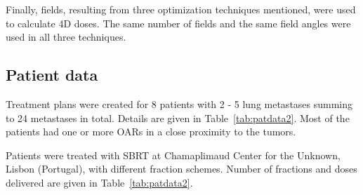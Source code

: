 \documentclass[type=dr, dr=rernat, accentcolor=tud7b,colorbacktitle, bigchapter, openright, twoside, 12pt ]{tudthesis}
\begin{document}
Finally, fields, resulting from three optimization techniques mentioned, were used to calculate 4D doses. The same number of fields and the same field angles were used in all three techniques.

\subsection{Patient data}

Treatment plans were created for 8 patients with 2 - 5 lung metastases summing to 24 metastases in total. Details are given in Table~\ref{tab:patdata2}.
Most of the patients had one or more OARs in a close proximity to the tumors. 

Patients were treated with SBRT at Chamaplimaud Center for the Unknown, Lisbon (Portugal), with different fraction schemes. Number of fractions and doses delivered are given in Table~\ref{tab:patdata2}. 
\end{document}

